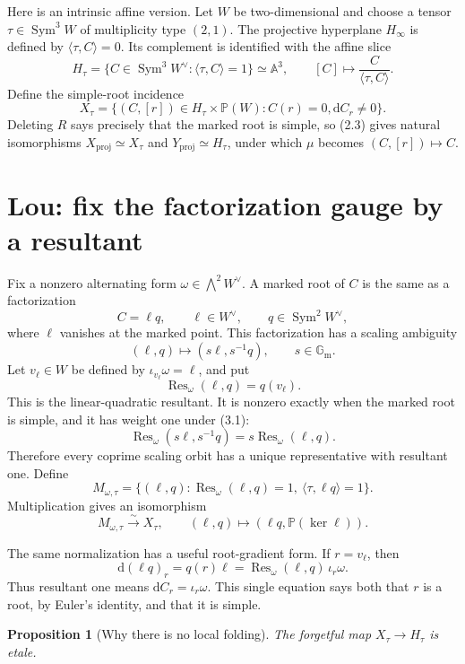 \documentclass[11pt,a4paper]{article}
\newtheorem{proposition}[theorem]{Proposition}
\theoremstyle{remark}
\DeclareMathOperator{\Sym}{Sym}
\DeclareMathOperator{\Res}{Res}
\newcommand{\A}{\mathbb A}
\newcommand{\Gm}{\mathbb G_{\mathrm m}}
\newcommand{\PP}{\mathbb P}
\newcommand{\dd}{\mathrm d}
\begin{document}
Here is an intrinsic affine version.  Let $W$ be two-dimensional and choose a
tensor $\tau\in\Sym^3W$ of multiplicity type $(2,1)$.  The projective
hyperplane $H_\infty$ is defined by
$\langle\tau,C\rangle=0$.  Its complement is identified with the affine slice
\[
H_\tau=\{C\in\Sym^3W^\vee:\langle\tau,C\rangle=1\}\simeq\A^3,
\qquad [C]\longmapsto\frac{C}{\langle\tau,C\rangle}.
\tag{2.3}
\]
Define the simple-root incidence
\[
X_\tau=\{(C,[r])\in H_\tau\times\PP(W):C(r)=0, \dd C_r\ne0\}.
\tag{2.4}
\]
Deleting $R$ says precisely that the marked root is simple, so (2.3) gives
natural isomorphisms $X_{\mathrm{proj}}\simeq X_\tau$ and
$Y_{\mathrm{proj}}\simeq H_\tau$, under which $\mu$ becomes
$(C,[r])\mapsto C$.

\section{Lou: fix the factorization gauge by a resultant}

Fix a nonzero alternating form $\omega\in\bigwedge^2W^\vee$.  A marked root
of $C$ is the same as a factorization
\[
  C=\ell q,\qquad \ell\in W^\vee,\qquad q\in\Sym^2W^\vee,
\]
where $\ell$ vanishes at the marked point.  This factorization has a scaling
ambiguity
\[
  (\ell,q)\longmapsto(s\ell,s^{-1}q),\qquad s\in\Gm.
\tag{3.1}
\]
Let $v_\ell\in W$ be defined by $\iota_{v_\ell}\omega=\ell$, and put
\[
  \Res_\omega(\ell,q)=q(v_\ell).
\tag{3.2}
\]
This is the linear-quadratic resultant.  It is nonzero exactly when the
marked root is simple, and it has weight one under (3.1):
\[
\Res_\omega(s\ell,s^{-1}q)=s\Res_\omega(\ell,q).
\]
Therefore every coprime scaling orbit has a unique representative with
resultant one.  Define
\[
M_{\omega,\tau}=
\{(\ell,q):\Res_\omega(\ell,q)=1,
\ \langle\tau,\ell q\rangle=1\}.
\tag{3.3}
\]
Multiplication gives an isomorphism
\[
M_{\omega,\tau}\xrightarrow{\sim}X_\tau,
\qquad(\ell,q)\longmapsto(\ell q,\PP(\ker\ell)).
\tag{3.4}
\]

The same normalization has a useful root-gradient form.  If
$r=v_\ell$, then
\[
  \dd(\ell q)_r=q(r)\ell
  =\Res_\omega(\ell,q)\,\iota_r\omega.
\tag{3.5}
\]
Thus resultant one means $\dd C_r=\iota_r\omega$.  This single equation says
both that $r$ is a root, by Euler's identity, and that it is simple.

\begin{proposition}[Why there is no local folding]\label{prop:etale}
The forgetful map $X_\tau\to H_\tau$ is etale.
\end{proposition}
\end{document}
